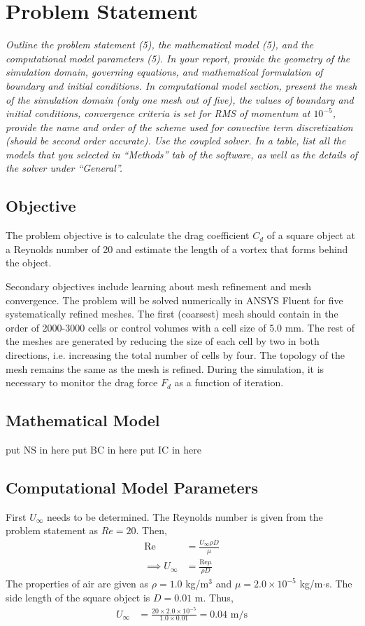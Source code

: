 \section{Problem Statement}
\textit{Outline the problem statement (5), the mathematical model (5), and the computational model parameters (5). In your report, provide the geometry of the simulation domain, governing equations, and mathematical formulation of boundary and initial conditions. In computational model section, present the mesh of the simulation domain (only one mesh out of five), the values of boundary and initial conditions, convergence criteria is set for RMS of momentum at $10^{-5}$, provide the name and order of the scheme used for convective term discretization (should be second order accurate). Use the coupled solver. In a table, list all the models that you selected in “Methods” tab of the software, as well as the details of the solver under “General”.}

\subsection{Objective}
The problem objective is to calculate the drag coefficient $C_d$ of a square object at a Reynolds number of 20 and estimate the length of a vortex that forms behind the object. 

Secondary objectives include learning about mesh refinement and mesh convergence. The problem will be solved numerically in ANSYS Fluent for five systematically refined meshes. The first (coarsest) mesh should contain in the order of 2000-3000 cells or control volumes with a cell size of 5.0 mm. The rest of the meshes are generated by reducing the size of each cell by two in both directions, i.e. increasing the total number of cells by four. The topology of the mesh remains the same as the mesh is refined. During the simulation, it is necessary to monitor the drag force $F_d$ as a function of iteration.

\subsection{Mathematical Model}
put NS in here
put BC in here
put IC in here

\subsection{Computational Model Parameters}
First $U_\infty$ needs to be determined. The Reynolds number is given from the problem statement as $Re = 20$. Then,
\begin{align*}
    \text{Re} &= \frac{U_\infty \rho D}{\mu} \\ 
    \implies U_\infty &= \frac{\text{Re} \mu}{\rho D}
\end{align*}
The properties of air are given as $\rho = 1.0$ kg/m$^3$ and $\mu = 2.0 \times 10^{-5}$ kg/m$\cdot$s. The side length of the square object is $D = 0.01$ m. Thus,
\begin{align*}
    U_\infty &= \frac{20 \times 2.0 \times 10^{-5}}{1.0 \times 0.01} = 0.04 \text{ m/s}
\end{align*}

